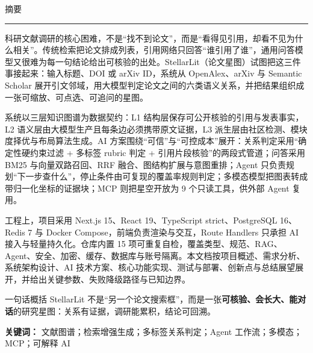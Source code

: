 \thispagestyle{plain}
\begin{center}
  {\heiti\LARGE 摘\quad 要}\\[2pt]
  {\color{rule}\rule{3.2cm}{0.7pt}}
\end{center}
\vspace{0.5em}


科研文献调研的核心困难，不是“找不到论文”，而是“看得见引用，却看不见为什么相关”。传统检索把论文排成列表，引用网络只回答“谁引用了谁”，通用问答模型又很难为每一句结论给出可核验的出处。StellarLit（论文星图）试图把这三件事接起来：输入标题、DOI 或 arXiv ID，系统从 OpenAlex、arXiv 与 Semantic Scholar 展开引文邻域，用大模型判定论文之间的六类语义关系，并把结果组织成一张可缩放、可点选、可追问的星图。

系统以三层知识图谱为数据契约：L1 结构层保存可公开核验的引用与发表事实，L2 语义层由大模型生产且每条边必须携带原文证据，L3 派生层由社区检测、模块度择优与布局算法生成。AI 方案围绕“可信”与“可控成本”展开：关系判定采用“确定性硬约束过滤 + 多标签 rubric 判定 + 引用片段核验”的两段式管道；问答采用 BM25 与向量双路召回、RRF 融合、图结构扩展与意图重排；Agent 只负责规划“下一步查什么”，停止条件由可复现的覆盖率规则判定；多模态模型把图表转成带归一化坐标的证据块；MCP 则把星空开放为 9 个只读工具，供外部 Agent 复用。

工程上，项目采用 Next.js 15、React 19、TypeScript strict、PostgreSQL 16、Redis 7 与 Docker Compose，前端负责渲染与交互，Route Handlers 只承担 AI 接入与轻量持久化。仓库内置 15 项可重复自检，覆盖类型、规范、RAG、Agent、安全、加密、缓存、数据库与账号隔离。本文档按项目概述、需求分析、系统架构设计、AI 技术方案、核心功能实现、测试与部署、创新点与总结展望展开，并给出关键参数、失败降级路径与已知边界。

\vspace{0.6em}
\begin{keybox}{一句话概括}
StellarLit 不是“另一个论文搜索框”，而是一张\textbf{可核验、会长大、能对话}的研究星图：关系有证据，调研能累积，结论可回溯。
\end{keybox}

\vspace{0.2em}
\noindent\textbf{关键词：} 文献图谱；检索增强生成；多标签关系判定；Agent 工作流；多模态；MCP；可解释 AI

